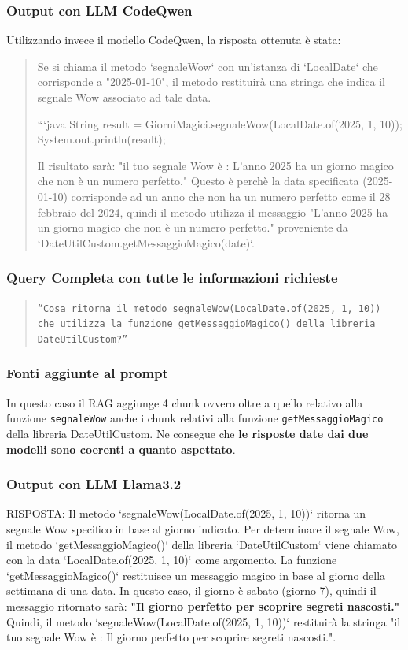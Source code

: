 \documentclass[12pt,a4paper,openright,twoside]{book}
\begin{document}
\subsubsection{Output con LLM CodeQwen}
Utilizzando invece il modello CodeQwen, la risposta ottenuta è stata:
\begin{quote}
    Se si chiama il metodo `segnaleWow` con un'istanza di `LocalDate` che corrisponde a "2025-01-10", il metodo restituirà una stringa che indica il segnale Wow associato ad tale data.

    ```java
    String result = GiorniMagici.segnaleWow(LocalDate.of(2025, 1, 10));
    System.out.println(result);
    
    Il risultato sarà: "il tuo segnale Wow è : L'anno 2025 ha un giorno magico che non è un numero perfetto."
    Questo è perchè la data specificata (2025-01-10) corrisponde ad un anno che non ha un numero perfetto come il 28 febbraio del 2024, quindi il metodo utilizza il messaggio "L'anno 2025 ha un giorno magico che non è un numero perfetto." proveniente da `DateUtilCustom.getMessaggioMagico(date)`.
\end{quote}

\subsubsection{Query Completa con tutte le informazioni richieste}
\begin{quote}
    \texttt{``Cosa ritorna il metodo segnaleWow(LocalDate.of(2025, 1, 10)) che utilizza la funzione getMessaggioMagico() della libreria DateUtilCustom?''}
\end{quote}
\subsubsection{Fonti aggiunte al prompt}
In questo caso il RAG aggiunge 4 chunk ovvero oltre a quello relativo alla funzione \texttt{segnaleWow} anche i chunk relativi alla funzione \texttt{getMessaggioMagico} della libreria DateUtilCustom.
Ne consegue che \textbf{le risposte date dai due modelli sono coerenti a quanto aspettato}.
\subsubsection{Output con LLM Llama3.2}
RISPOSTA:
Il metodo `segnaleWow(LocalDate.of(2025, 1, 10))` ritorna un segnale Wow specifico in base al giorno indicato.
Per determinare il segnale Wow, il metodo `getMessaggioMagico()` della libreria `DateUtilCustom` viene chiamato con la data `LocalDate.of(2025, 1, 10)` come argomento.
La funzione `getMessaggioMagico()` restituisce un messaggio magico in base al giorno della settimana di una data. In questo caso, il giorno è sabato (giorno 7), quindi il messaggio ritornato sarà:
\textbf{"Il giorno perfetto per scoprire segreti nascosti."}
Quindi, il metodo `segnaleWow(LocalDate.of(2025, 1, 10))` restituirà la stringa "il tuo segnale Wow è : Il giorno perfetto per scoprire segreti nascosti.".
\end{document}
